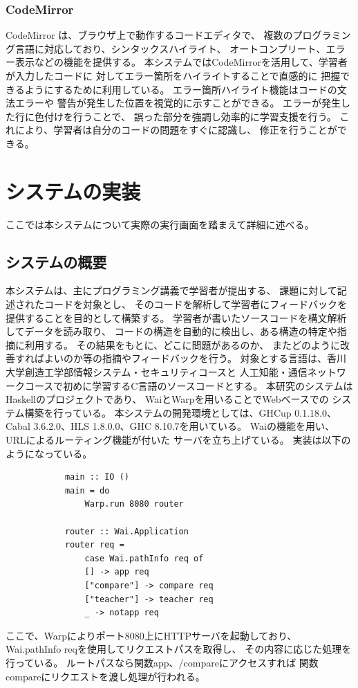 \documentclass{cssspaper}
\begin{document}
            \subsection{CodeMirror}
            CodeMirror \cite{16}は、ブラウザ上で動作するコードエディタで、
            複数のプログラミング言語に対応しており、シンタックスハイライト、
            オートコンプリート、エラー表示などの機能を提供する。
            本システムではCodeMirrorを活用して、学習者が入力したコードに
            対してエラー箇所をハイライトすることで直感的に
            把握できるようにするために利用している。
            エラー箇所ハイライト機能はコードの文法エラーや
            警告が発生した位置を視覚的に示すことができる。
            エラーが発生した行に色付けを行うことで、
            誤った部分を強調し効率的に学習支援を行う。
            これにより、学習者は自分のコードの問題をすぐに認識し、
            修正を行うことができる。

    \chapter{システムの実装}
    ここでは本システムについて実際の実行画面を踏まえて詳細に述べる。
        \section{システムの概要}
        本システムは、主にプログラミング講義で学習者が提出する、
        課題に対して記述されたコードを対象とし、
        そのコードを解析して学習者にフィードバックを提供することを目的として構築する。
        学習者が書いたソースコードを構文解析してデータを読み取り、
        コードの構造を自動的に検出し、ある構造の特定や指摘に利用する。
        その結果をもとに、どこに問題があるのか、
        またどのように改善すればよいのか等の指摘やフィードバックを行う。
        対象とする言語は、香川大学創造工学部情報システム・セキュリティコースと
        人工知能・通信ネットワークコースで初めに学習するC言語のソースコードとする。
        本研究のシステムはHaskellのプロジェクトであり、
        WaiとWarpを用いることでWebベースでの
        システム構築を行っている。
        本システムの開発環境としては、GHCup 0.1.18.0、
        Cabal 3.6.2.0、HLS 1.8.0.0、GHC 8.10.7を用いている。
        Waiの機能を用い、URLによるルーティング機能が付いた
        サーバを立ち上げている。
        実装は以下のようになっている。
        \begin{lstlisting}
            main :: IO ()
            main = do
                Warp.run 8080 router
            
            router :: Wai.Application
            router req =
                case Wai.pathInfo req of
                [] -> app req
                ["compare"] -> compare req
                ["teacher"] -> teacher req
                _ -> notapp req
        \end{lstlisting}
        ここで、Warpによりポート8080上にHTTPサーバを起動しており、
        Wai.pathInfo reqを使用してリクエストパスを取得し、
        その内容に応じた処理を行っている。
        ルートパスなら関数app、/compareにアクセスすれば
        関数compareにリクエストを渡し処理が行われる。
        
\end{document}
